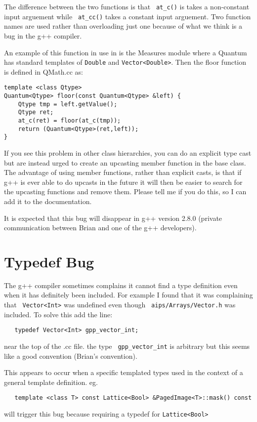 The difference between the two functions is that \texttt{ at\_c()} is takes
a non-constant input arguement while \texttt{ at\_cc()} takes a constant
input arguement. Two function names are used rather than overloading just
one because of what we think is a bug in the g++ compiler. 

An example of this function in use in is the Measures module where a Quantum
has standard templates of \texttt{Double} and \texttt{Vector<Double>}. Then
the floor function is defined in QMath.cc as:
\begin{verbatim}
template <class Qtype>
Quantum<Qtype> floor(const Quantum<Qtype> &left) {
    Qtype tmp = left.getValue(); 
    Qtype ret;
    at_c(ret) = floor(at_c(tmp));
    return (Quantum<Qtype>(ret,left));
}
\end{verbatim}

If you see this problem in other class hierarchies, you can do an explicit
type cast but are instead urged to create an upcasting member function in
the base class. The advantage of using member functions, rather than
explicit casts, is that if g++ is ever able to do upcasts in the future it
will then be easier to search for the upcasting functions and remove
them. Please tell me if you do this, so I can add it to the documentation. 

It is expected that this bug will disappear in g++ version 2.8.0 (private
communication between Brian and one of the g++ developers).

\section{Typedef Bug\label{sec:typedef} }   
The g++ compiler sometimes complains it cannot
find a type definition even when it has definitely been included. For
example I found that it was complaining that \texttt{ Vector<Int>} was
undefined even though \texttt{ aips/Arrays/Vector.h} was included. To
solve this add the line:
\begin{verbatim}
   typedef Vector<Int> gpp_vector_int;
\end{verbatim}
near the top of the .cc file. the type \texttt{ gpp\_vector\_int} is
arbitrary but this seems like a good convention (Brian's convention).
   
This appears to occur when a specific templated types used in the context
of a general template definition. eg.
\begin{verbatim}
   template <class T> const Lattice<Bool> &PagedImage<T>::mask() const
\end{verbatim}
will trigger this bug because requiring a typedef for \texttt{Lattice<Bool>}

